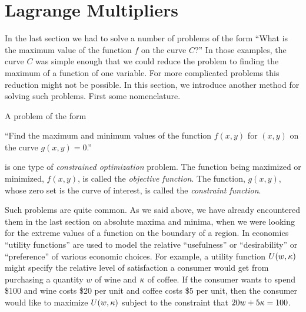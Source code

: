 \section{Lagrange Multipliers}\label{sec Lagrange}

In the last section we had to solve a number of problems
of the form ``What is the maximum value of the function $f$
on the curve $C$?'' In those examples, the curve $C$ was simple
enough that we could reduce the problem to finding the maximum
of a function of one variable. For more complicated problems 
this reduction might not be possible. In this section, we introduce
another method for solving such problems. First some nomenclature. 

\begin{defn}\label{def constrained optimization}
A problem of the form
\begin{description}
\item ``Find the maximum and minimum values of the function 
$f(x,y)$ for $(x,y)$ on the curve $g(x,y)=0$.'' 
\end{description}
is one type of \emph{constrained optimization} problem. The function
being maximized or minimized, $f(x,y)$, is called the \emph{objective
function}. The function, $g(x,y)$, whose zero set is the curve of interest,
is called the \emph{constraint function}. 
\end{defn}

Such problems are quite common. As we said above, we have already 
encountered them in the last section on absolute maxima and minima, 
when we were looking for the extreme values of a function on the 
boundary of a region. In economics 
``utility functions'' are used to model the relative ``usefulness'' 
or ``desirability'' or ``preference'' 
of various economic choices. For example, a utility function $U(w,\kappa)$ 
might specify the relative level of satisfaction a consumer would get
from purchasing a quantity $w$ of wine and $\kappa$ of coffee. If the consumer
wants to spend \$100 and wine costs \$20 per unit
and coffee costs \$5 per unit, then the consumer would like to maximize
$U(w,\kappa)$ subject to the constraint that $20w+5\kappa=100$.
 

